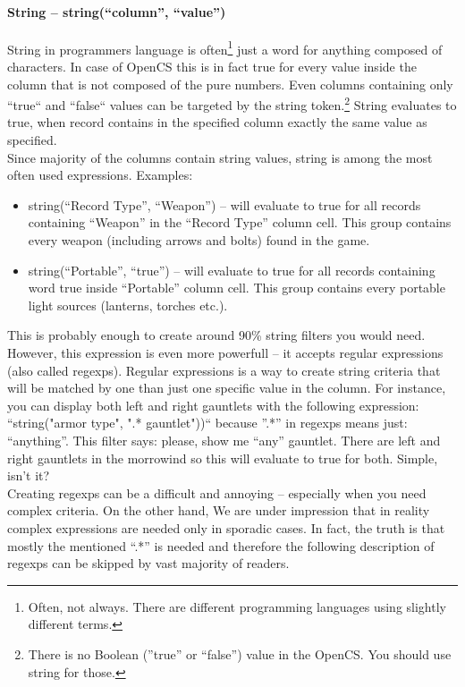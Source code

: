 \paragraph{String -- string(``column'', ``value'')}
String in programmers language is often\footnote{Often, not always. There are different programming languages using slightly different terms.} just a word for anything composed of characters. In case of OpenCS this is in fact true for every value inside the column that is not composed of the pure numbers. Even columns containing only ``true`` and ``false`` values can be targeted by the string token.\footnote{There is no Boolean (''true'' or ``false'') value in the OpenCS. You should use string for those.} String evaluates to true, when record contains in the specified column exactly the same value as specified.
\\
Since majority of the columns contain string values, string is among the most often used expressions. Examples:
\begin{itemize}
 \item string(``Record Type'', ``Weapon'') -- will evaluate to true for all records containing ``Weapon'' in the ``Record Type'' column cell. This group contains every weapon (including arrows and bolts) found in the game.
 \item string(``Portable'', ``true'') -- will evaluate to true for all records containing word true inside ``Portable'' column cell. This group contains every portable light sources (lanterns, torches etc.).
\end{itemize}
This is probably enough to create around 90\% string filters you would need. However, this expression is even more powerfull -- it accepts regular expressions (also called regexps). Regular expressions is a way to create string criteria that will be matched by one than just one specific value in the column. For instance, you can display both left and right gauntlets with the following expression: ``string("armor type", ".* gauntlet"))`` because ''.*'' in regexps means just: ``anything''. This filter says: please, show me ``any'' gauntlet. There are left and right gauntlets in the morrowind so this will evaluate to true for both. Simple, isn't it?
\\
Creating regexps can be a difficult and annoying -- especially when you need complex criteria. On the other hand, We are under impression that in reality complex expressions are needed only in sporadic cases. In fact, the truth is that mostly the mentioned ``.*'' is needed and therefore the following description of regexps can be skipped by vast majority of readers.


